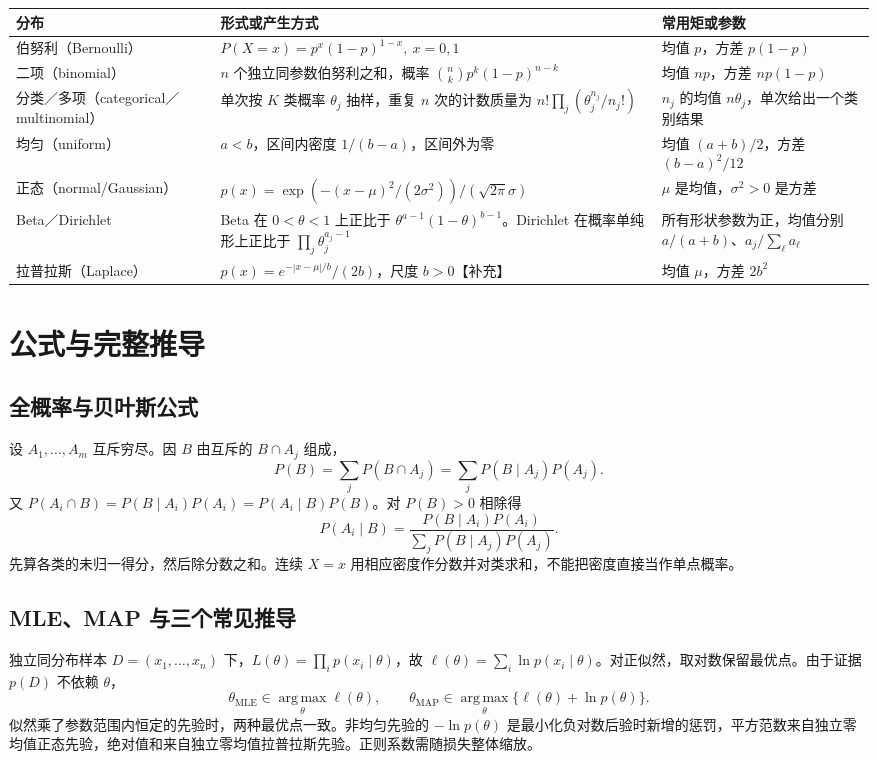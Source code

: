 \documentclass[UTF8,a4paper,zihao=-4,fontset=fandol]{ctexrep}
\begin{document}
\noindent\begin{tabularx}{\linewidth}{@{}p{.23\linewidth}X X@{}}
\toprule
分布 & 形式或产生方式 & 常用矩或参数\\
\midrule
伯努利（Bernoulli） & \(P(X=x)=p^x(1-p)^{1-x},\ x=0,1\) & 均值 \(p\)，方差 \(p(1-p)\)\\
二项（binomial） & \(n\) 个独立同参数伯努利之和，概率 \(\binom nkp^k(1-p)^{n-k}\) & 均值 \(np\)，方差 \(np(1-p)\)\\
分类／多项（categorical／multinomial） & 单次按 \(K\) 类概率 \(\theta_j\) 抽样，重复 \(n\) 次的计数质量为 \(n!\prod_j(\theta_j^{n_j}/n_j!)\) & \(n_j\) 的均值 \(n\theta_j\)，单次给出一个类别结果\\
均匀（uniform） & \(a<b\)，区间内密度 \(1/(b-a)\)，区间外为零 & 均值 \((a+b)/2\)，方差 \((b-a)^2/12\)\\
正态（normal/Gaussian） & \(p(x)=\exp(-(x-\mu)^2/(2\sigma^2))/(\sqrt{2\pi}\sigma)\) & \(\mu\) 是均值，\(\sigma^2>0\) 是方差\\
Beta／Dirichlet & Beta 在 \(0<\theta<1\) 上正比于 \(\theta^{a-1}(1-\theta)^{b-1}\)。Dirichlet 在概率单纯形上正比于 \(\prod_j\theta_j^{a_j-1}\) & 所有形状参数为正，均值分别 \(a/(a+b)\)、\(a_j/\sum_\ell a_\ell\)\\
拉普拉斯（Laplace） & \(p(x)=e^{-|x-\mu|/b}/(2b)\)，尺度 \(b>0\)【补充】 & 均值 \(\mu\)，方差 \(2b^2\)\\
\bottomrule
\end{tabularx}

\section{公式与完整推导}
\subsection*{全概率与贝叶斯公式}
设 \(A_1,\ldots,A_m\) 互斥穷尽。因 \(B\) 由互斥的 \(B\cap A_j\) 组成，
\[
 P(B)=\sum_jP(B\cap A_j)=\sum_jP(B\mid A_j)P(A_j).
\]
又 \(P(A_i\cap B)=P(B\mid A_i)P(A_i)=P(A_i\mid B)P(B)\)。对 \(P(B)>0\) 相除得
\[
 P(A_i\mid B)=\frac{P(B\mid A_i)P(A_i)}{\sum_jP(B\mid A_j)P(A_j)}.
\]
先算各类的未归一得分，然后除分数之和。连续 \(X=x\) 用相应密度作分数并对类求和，不能把密度直接当作单点概率。

\subsection*{MLE、MAP 与三个常见推导}
独立同分布样本 \(D=(x_1,\ldots,x_n)\) 下，\(L(\theta)=\prod_i p(x_i\mid\theta)\)，故 \(\ell(\theta)=\sum_i\ln p(x_i\mid\theta)\)。对正似然，取对数保留最优点。由于证据 \(p(D)\) 不依赖 \(\theta\)，
\[
 \theta_{\mathrm{MLE}}\in\operatorname*{arg\,max}_\theta\ell(\theta),
 \qquad
 \theta_{\mathrm{MAP}}\in\operatorname*{arg\,max}_\theta\{\ell(\theta)+\ln p(\theta)\}.
\]
似然乘了参数范围内恒定的先验时，两种最优点一致。非均匀先验的 \(-\ln p(\theta)\) 是最小化负对数后验时新增的惩罚，平方范数来自独立零均值正态先验，绝对值和来自独立零均值拉普拉斯先验。正则系数需随损失整体缩放。
\end{document}

